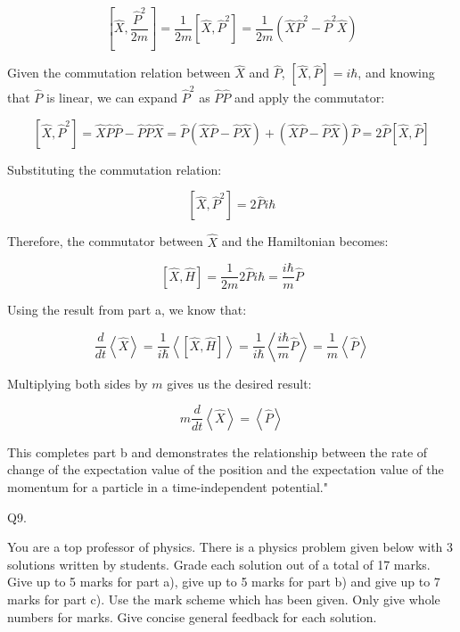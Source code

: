 \[
\left[ \hat{X}, \frac{\hat{P}^2}{2m}\right] = \frac{1}{2m}\left[ \hat{X}, \hat{P}^2\right] = \frac{1}{2m}\left( \hat{X}\hat{P}^2 - \hat{P}^2\hat{X} \right)
\]

Given the commutation relation between \(\hat{X}\) and \(\hat{P}\), \(\left[ \hat{X}, \hat{P} \right] = i\hbar\), and knowing that \(\hat{P}\) is linear, we can expand \(\hat{P}^2\) as \(\hat{P}\hat{P}\) and apply the commutator:

\[
\left[ \hat{X}, \hat{P}^2\right] = \hat{X}\hat{P}\hat{P} - \hat{P}\hat{P}\hat{X} = \hat{P}\left( \hat{X}\hat{P} - \hat{P}\hat{X} \right) + \left( \hat{X}\hat{P} - \hat{P}\hat{X} \right)\hat{P} = 2\hat{P}\left[ \hat{X}, \hat{P} \right]
\]

Substituting the commutation relation:

\[
\left[ \hat{X}, \hat{P}^2\right] = 2\hat{P}i\hbar
\]

Therefore, the commutator between \(\hat{X}\) and the Hamiltonian becomes:

\[
\left[ \hat{X}, \hat{H}\right] = \frac{1}{2m}2\hat{P}i\hbar = \frac{i\hbar}{m}\hat{P}
\]

Using the result from part a, we know that:

\[
\frac{d}{dt}\left<\hat{X}\right> = \frac{1}{i\hbar}\left< \left[ \hat{X}, \hat{H} \right] \right> = \frac{1}{i\hbar}\left< \frac{i\hbar}{m}\hat{P} \right> = \frac{1}{m}\left<\hat{P}\right>
\]

Multiplying both sides by \(m\) gives us the desired result:

\[
m\frac{d}{dt}\left<\hat{X}\right> = \left<\hat{P}\right>
\]

This completes part b and demonstrates the relationship between the rate of change of the expectation value of the position and the expectation value of the momentum for a particle in a time-independent potential."



                           Q9. 

You are a top professor of physics. There is a physics problem given below with 3 solutions written by students. Grade each solution out of a total of 17 marks. Give up to 5 marks for part a), give up to 5 marks for part b) and give up to 7 marks for part c). Use the mark scheme which has been given. Only give whole numbers for marks. Give concise general feedback for each solution. 

